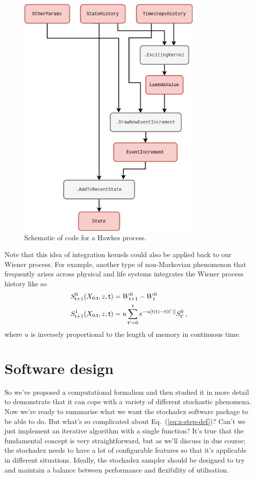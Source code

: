\begin{figure}[h]
\centering
\includegraphics[width=9cm]{images/chapter-1-hawkes-process.drawio.png}
\caption{Schematic of code for a Hawkes process.}
\label{fig:hawkes-process}
\end{figure}

Note that this idea of integration kernels could also be applied back to our Wiener process. For example, another type of non-Markovian phenomenon that frequently arises across physical and life systems integrates the Wiener process history like so
\begin{align}
S^{0}_{{\sf t}+1}(X_{0:{\sf t}},z,{\sf t}) &= W^0_{{\sf t}+1}-W^0_{\sf t}\\
S^{1}_{{\sf t}+1}(X_{0:{\sf t}},z,{\sf t}) &= u\sum^{{\sf t}}_{{\sf t}'=0}e^{-u[t({\sf t})-t({\sf t}')]} S^{0}_{{\sf t}'}\,,
\end{align}
where $u$ is inversely proportional to the length of memory in continuous time.

\section{\sffamily Software design}

So we've proposed a computational formalism and then studied it in more detail to demonstrate that it can cope with a variety of different stochastic phenomena. Now we're ready to summarise what we want the stochadex software package to be able to do. But what's so complicated about Eq.~(\ref{eq:x-step-def})? Can't we just implement an iterative algorithm with a single function? It's true that the fundamental concept is very straightforward, but as we'll discuss in due course; the stochadex needs to have a lot of configurable features so that it's applicable in different situations. Ideally, the stochadex sampler should be designed to try and maintain a balance between performance and flexibility of utilisation.

